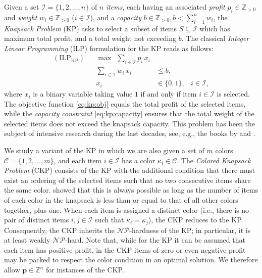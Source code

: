 \documentclass[preprint,11pt]{elsarticle}
\newcommand{\items}{\mathcal{I}}
\newcommand{\colors}{\mathcal{C}}
\newcommand{\profit}{p}
\newcommand{\weight}{w}
\newcommand{\capacity}{b}
\newcommand{\formKP}{\text{ILP}_\text{KP}}
\theoremstyle{definition}
\begin{document}
Given a set $\items=\{1,2,\dots,n\}$ of $n$ {\em items}, each having an associated {\em profit} $\profit_i \in \mathbb{Z}_{> 0}$ and {\em weight} $\weight_i \in \mathbb{Z}_{>0}$
($i \in \items$), and a {\em capacity} $\capacity \in \mathbb{Z}_{>0}, b < \sum_{i = 1}^n \weight_i$,
the {\em Knapsack Problem} (KP) asks to select a subset of items $S \subseteq \items$ which has maximum total profit, and a total weight not exceeding $\capacity$. The classical \textit{Integer Linear Programming} (ILP) formulation for the KP reads as follows:
\begin{subequations}\label{form:KP}
\begin{align}
(\formKP)  && \max ~~\sum_{i \in \items} \profit_i \, x_i \label{eq:kp:obj}\\
  &&\sum_{i \in \items} \weight_i \, x_i & \leq \capacity, \label{eq:kp:capacity}\\
  && x_i&\in\{0,1\}, & i \in \items, \label{eq:KP3}
\end{align}
\end{subequations}
where $x_i$ is a binary variable taking value $1$ if and only if item $i \in \items$ is selected. The objective function \eqref{eq:kp:obj} equals the total profit of the selected items, while the \emph{capacity constraint} \eqref{eq:kp:capacity} ensures that the total weight of the selected items does not exceed the knapsack capacity. This problem has been the subject of intensive research during the last decades, see, e.g., the books by \cite{KPP04li} and \cite{MT90}.

\smallskip
We study a variant of the KP in which we are also given a set of $m$ colors $\colors = \{1, 2, \dots, m\}$, and each item $i \in \items$ has a color $\kappa_i \in \colors$.
The {\em Colored Knapsack Problem} (CKP) consists of the KP with the additional condition that there must exist an ordering of the selected items such that no two consecutive items share the same color.
\citet{BorgesSM24} showed that this is always possible as long as the number of items of each color in the knapsack is less than or equal to that of all other colors together, plus one.
When each item is assigned a distinct color (i.e., there is no pair of distinct items $ i, j \in \items $ such that $ \kappa_i = \kappa_j $), the CKP reduces to the KP. Consequently, the CKP inherits the $\mathcal{NP}$-hardness of the KP; in particular, it is at least weakly $\mathcal{NP}$-hard.
Note that, while for the KP it can be assumed that each item has positive profit, in the CKP items of zero or even negative profit may be packed to respect the color condition in an optimal solution. 
We therefore allow $\boldsymbol \profit \in \mathbb{Z}^n$ for instances of the CKP.
\end{document}
